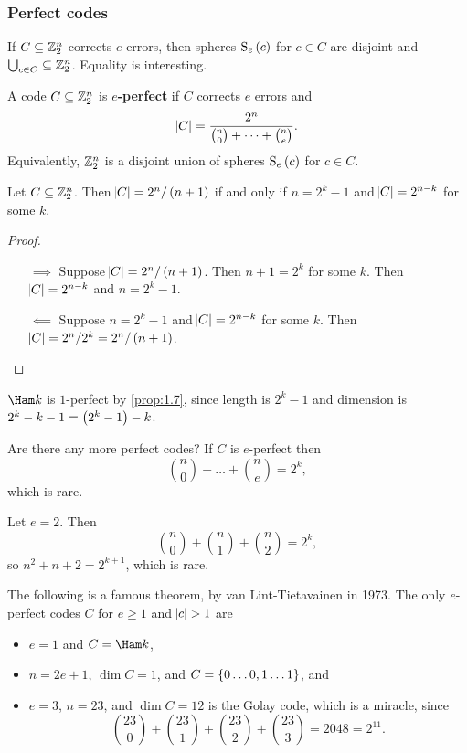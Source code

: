 \subsubsection{Perfect codes}

If $ C \subseteq \mathbb{Z}_2^n $ corrects $ e $ errors, then spheres $ \S_e\br{c} $ for $ c \in C $ are disjoint and $ \bigcup_{c \in C} \subseteq \mathbb{Z}_2^n $. Equality is interesting.

\begin{definition*}
A code $ C \subseteq \mathbb{Z}_2^n $ is \textbf{$ e $-perfect} if $ C $ corrects $ e $ errors and
$$ \abs{C} = \dfrac{2^n}{\binom{n}{0} + \dots + \binom{n}{e}}. $$
Equivalently, $ \mathbb{Z}_2^n $ is a disjoint union of spheres $ \S_e\br{c} $ for $ c \in C $.
\end{definition*}

\begin{proposition}
Let $ C \subseteq \mathbb{Z}_2^n $. Then $ \abs{C} = 2^n / \br{n + 1} $ if and only if $ n = 2^k - 1 $ and $ \abs{C} = 2^{n - k} $ for some $ k $.
\end{proposition}

\begin{proof}
\hfill
\begin{itemize}
\item[$ \implies $] Suppose $ \abs{C} = 2^n / \br{n + 1} $. Then $ n + 1 = 2^k $ for some $ k $. Then $ \abs{C} = 2^{n - k} $ and $ n = 2^k - 1 $.
\item[$ \impliedby $] Suppose $ n = 2^k - 1 $ and $ \abs{C} = 2^{n - k} $ for some $ k $. Then $ \abs{C} = 2^n / 2^k = 2^n / \br{n + 1} $.
\end{itemize}
\end{proof}

\begin{example*}
$ \Ham k $ is $ 1 $-perfect by \ref{prop:1.7}, since length is $ 2^k - 1 $ and dimension is $ 2^k - k - 1 = \br{2^k - 1} - k $.
\end{example*}

Are there any more perfect codes? If $ C $ is $ e $-perfect then
$$ \binom{n}{0} + \dots + \binom{n}{e} = 2^k, $$
which is rare.

\begin{example*}
Let $ e = 2 $. Then
$$ \binom{n}{0} + \binom{n}{1} + \binom{n}{2} = 2^k, $$
so $ n^2 + n + 2 = 2^{k + 1} $, which is rare.
\end{example*}

The following is a famous theorem, by van Lint-Tietavainen in 1973. The only $ e $-perfect codes $ C $ for $ e \ge 1 $ and $ \abs{c} > 1 $ are
\begin{itemize}
\item $ e = 1 $ and $ C = \Ham k $,
\item $ n = 2e + 1 $, $ \dim C = 1 $, and $ C = \cbr{0 \dots 0, 1 \dots 1} $, and
\item $ e = 3 $, $ n = 23 $, and $ \dim C = 12 $ is the Golay code, which is a miracle, since
$$ \binom{23}{0} + \binom{23}{1} + \binom{23}{2} + \binom{23}{3} = 2048 = 2^{11}. $$
\end{itemize}

